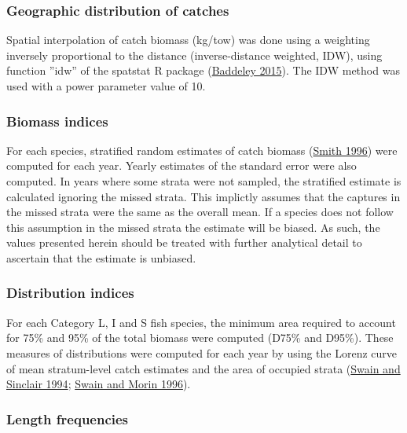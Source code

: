 \documentclass[12pt]{article}\usepackage[]{graphicx}\usepackage[]{color}
\begin{document}
\hypertarget{geographic-distribution-of-catches}{%
\subsubsection{Geographic distribution of catches}\label{geographic-distribution-of-catches}}

Spatial interpolation of catch biomass (kg/tow) was done using a weighting inversely proportional to the distance (inverse-distance weighted, IDW), using function ''idw'' of the spatstat R package (\protect\hyperlink{ref-R:package:spatstat}{Baddeley 2015}). The IDW method was used with a power parameter value of 10.

\hypertarget{biomass-indices}{%
\subsubsection{Biomass indices}\label{biomass-indices}}

For each species, stratified random estimates of catch biomass (\protect\hyperlink{ref-Smith:1996}{Smith 1996}) were computed for each year. Yearly estimates of the standard error were also computed. In years where some strata were not sampled, the stratified estimate is calculated ignoring the missed strata. This implictly assumes that the captures in the missed strata were the same as the overall mean. If a species does not follow this assumption in the missed strata the estimate will be biased. As such, the values presented herein should be treated with further analytical detail to ascertain that the estimate is unbiased.

\hypertarget{distribution-indices}{%
\subsubsection{Distribution indices}\label{distribution-indices}}

For each Category L, I and S fish species, the minimum area required to account for 75\% and 95\% of the total biomass were computed (D75\% and D95\%). These measures of distributions were computed for each year by using the Lorenz curve of mean stratum-level catch estimates and the area of occupied strata (\protect\hyperlink{ref-Swain:Sinclair:1994:cjfas}{Swain and Sinclair 1994}; \protect\hyperlink{ref-Swain:Morin:1996:cjfas}{Swain and Morin 1996}).

\hypertarget{length-frequencies}{%
\subsubsection{Length frequencies}\label{length-frequencies}}
\end{document}
